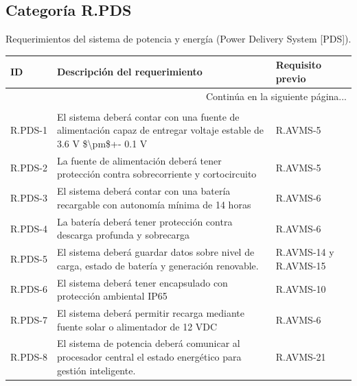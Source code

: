 \documentclass{article}%
\begin{document}
\subsection{Categoría R.PDS}%
\label{subsec:CategoraR.PDS}%
Requerimientos del sistema de potencia y energía (Power Delivery System [PDS]).\newline%
\newline%
%
\begin{longtable}{|p{2cm}|p{9cm}|p{2.5cm}|}%
\hline%
ID&Descripción del requerimiento&Requisito previo\\%
\hline%
\endhead%
\hline%
\multicolumn{3}{|r|}{Continúa en la siguiente página...}\\%
\hline%
\endfoot%
\hline%
\multicolumn{3}{|r|}{Fin de la tabla}\\%
\hline%
\endlastfoot%
R.PDS{-}1& El sistema deberá contar con una fuente de alimentación capaz de entregar voltaje estable de 3.6 V \$\textbackslash{}pm\$+{-} 0.1 V& R.AVMS{-}5\\%
\hline%
R.PDS{-}2& La fuente de alimentación deberá tener protección contra sobrecorriente y cortocircuito& R.AVMS{-}5\\%
\hline%
R.PDS{-}3& El sistema deberá contar con una batería recargable con autonomía mínima de 14 horas& R.AVMS{-}6\\%
\hline%
R.PDS{-}4& La batería deberá tener protección contra descarga profunda y sobrecarga& R.AVMS{-}6\\%
\hline%
R.PDS{-}5& El sistema deberá guardar datos sobre nivel de carga, estado de batería y generación renovable.&R.AVMS{-}14 y R.AVMS{-}15\\%
\hline%
R.PDS{-}6& El sistema deberá tener encapsulado con protección ambiental IP65& R.AVMS{-}10\\%
\hline%
R.PDS{-}7& El sistema deberá permitir recarga mediante fuente solar o alimentador de 12 VDC& R.AVMS{-}6\\%
\hline%
R.PDS{-}8& El sistema de potencia deberá comunicar al procesador central el estado energético para gestión inteligente.& R.AVMS{-}21\\%
\hline%
\end{longtable}

%
\newpage%
\end{document}
